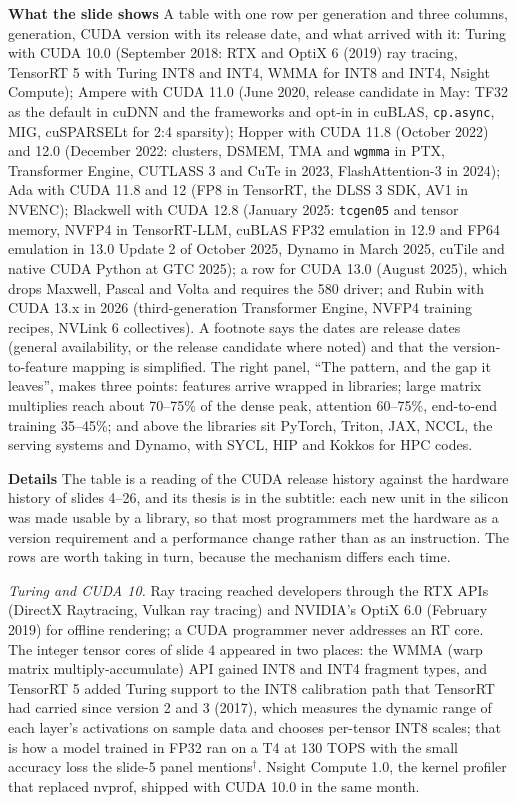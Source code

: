 \documentclass[11pt,letterpaper]{article}
\newcommand{\para}[1]{\medskip\noindent\textbf{#1}\quad}
\begin{document}
\para{What the slide shows} A table with one row per generation and three columns, generation, CUDA version with its release date, and what arrived with it: Turing with CUDA 10.0 (September 2018: RTX and OptiX 6 (2019) ray tracing, TensorRT 5 with Turing INT8 and INT4, WMMA for INT8 and INT4, Nsight Compute); Ampere with CUDA 11.0 (June 2020, release candidate in May: TF32 as the default in cuDNN and the frameworks and opt-in in cuBLAS, \texttt{cp.async}, MIG, cuSPARSELt for 2:4 sparsity); Hopper with CUDA 11.8 (October 2022) and 12.0 (December 2022: clusters, DSMEM, TMA and \texttt{wgmma} in PTX, Transformer Engine, CUTLASS 3 and CuTe in 2023, FlashAttention-3 in 2024); Ada with CUDA 11.8 and 12 (FP8 in TensorRT, the DLSS 3 SDK, AV1 in NVENC); Blackwell with CUDA 12.8 (January 2025: \texttt{tcgen05} and tensor memory, NVFP4 in TensorRT-LLM, cuBLAS FP32 emulation in 12.9 and FP64 emulation in 13.0 Update 2 of October 2025, Dynamo in March 2025, cuTile and native CUDA Python at GTC 2025); a row for CUDA 13.0 (August 2025), which drops Maxwell, Pascal and Volta and requires the 580 driver; and Rubin with CUDA 13.x in 2026 (third-generation Transformer Engine, NVFP4 training recipes, NVLink 6 collectives). A footnote says the dates are release dates (general availability, or the release candidate where noted) and that the version-to-feature mapping is simplified. The right panel, ``The pattern, and the gap it leaves'', makes three points: features arrive wrapped in libraries; large matrix multiplies reach about 70--75\% of the dense peak, attention 60--75\%, end-to-end training 35--45\%; and above the libraries sit PyTorch, Triton, JAX, NCCL, the serving systems and Dynamo, with SYCL, HIP and Kokkos for HPC codes.

\para{Details} The table is a reading of the CUDA release history against the hardware history of slides 4--26, and its thesis is in the subtitle: each new unit in the silicon was made usable by a library, so that most programmers met the hardware as a version requirement and a performance change rather than as an instruction. The rows are worth taking in turn, because the mechanism differs each time.

\emph{Turing and CUDA 10.} Ray tracing reached developers through the RTX APIs (DirectX Raytracing, Vulkan ray tracing) and NVIDIA's OptiX 6.0 (February 2019) for offline rendering; a CUDA programmer never addresses an RT core. The integer tensor cores of slide 4 appeared in two places: the WMMA (warp matrix multiply-accumulate) API gained INT8 and INT4 fragment types, and TensorRT 5 added Turing support to the INT8 calibration path that TensorRT had carried since version 2 and 3 (2017), which measures the dynamic range of each layer's activations on sample data and chooses per-tensor INT8 scales; that is how a model trained in FP32 ran on a T4 at 130 TOPS with the small accuracy loss the slide-5 panel mentions$^\dagger$. Nsight Compute 1.0, the kernel profiler that replaced nvprof, shipped with CUDA 10.0 in the same month.
\end{document}
